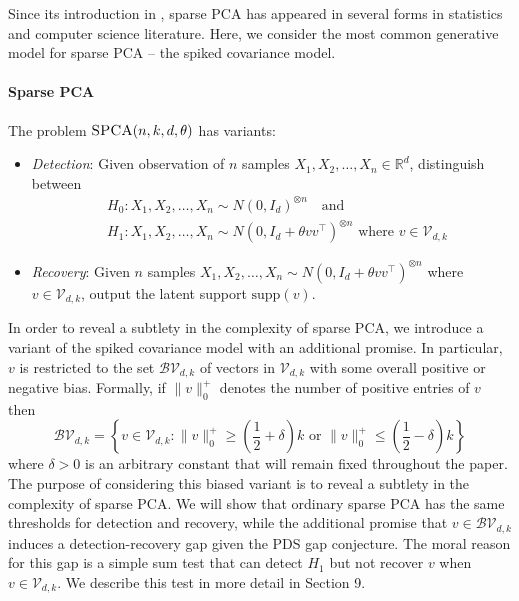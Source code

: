 \documentclass[11pt]{article}
\begin{document}
Since its introduction in \cite{johnstoneSparse04}, sparse PCA has appeared in several forms in statistics and computer science literature. Here, we consider the most common generative model for sparse PCA -- the spiked covariance model.

\paragraph{Sparse PCA} The problem $\textsc{SPCA}(n, k, d, \theta)$ has variants:
\begin{itemize}
\item \emph{Detection}: Given observation of $n$ samples $X_1, X_2, \dots, X_n \in \mathbb{R}^d$, distinguish between
\begin{align*}
&H_0: X_1, X_2, \dots, X_n \sim N(0, I_d)^{\otimes n} \quad \text{and} \\
&H_1 : X_1, X_2, \dots, X_n \sim N\left(0, I_d + \theta vv^\top\right)^{\otimes n} \text{ where } v \in \mathcal{V}_{d, k}
\end{align*}
\item \emph{Recovery}: Given $n$ samples $X_1, X_2, \dots, X_n \sim N(0, I_d + \theta vv^\top)^{\otimes n}$ where $v \in\mathcal{V}_{d, k}$, output the latent support $\text{supp}(v)$.
\end{itemize}

In order to reveal a subtlety in the complexity of sparse PCA, we introduce a variant of the spiked covariance model with an additional promise. In particular, $v$ is restricted to the set $\mathcal{BV}_{d, k}$ of vectors in $\mathcal{V}_{d,k}$ with some overall positive or negative bias. Formally, if $\| v \|_0^+$ denotes the number of positive entries of $v$ then
$$\mathcal{BV}_{d, k} = \left\{ v \in \mathcal{V}_{d, k} : \| v \|_0^+ \ge \left( \frac{1}{2} + \delta \right) k \text{ or } \| v \|_0^+ \le \left( \frac{1}{2} - \delta \right) k \right\}$$
where $\delta > 0$ is an arbitrary constant that will remain fixed throughout the paper. The purpose of considering this biased variant is to reveal a subtlety in the complexity of sparse PCA. We will show that ordinary sparse PCA has the same thresholds for detection and recovery, while the additional promise that $v \in \mathcal{BV}_{d, k}$ induces a detection-recovery gap given the PDS gap conjecture. The moral reason for this gap is a simple sum test that can detect $H_1$ but not recover $v$ when $v \in \mathcal{V}_{d, k}$. We describe this test in more detail in Section 9.
\end{document}
